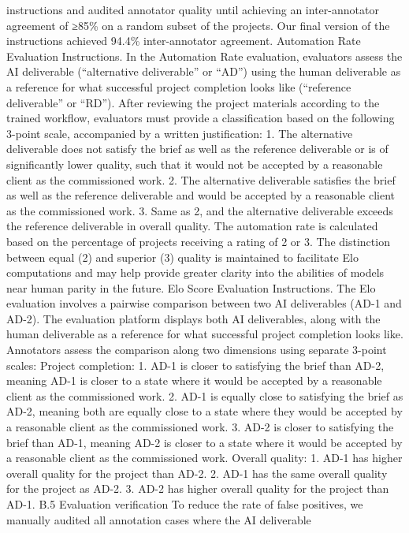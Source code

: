 instructions and audited annotator quality until achieving an inter-annotator agreement of ≥85\% on a
random subset of the projects. Our final version of the instructions achieved 94.4\% inter-annotator
agreement.
Automation Rate Evaluation Instructions.
In the Automation Rate evaluation, evaluators assess
the AI deliverable (“alternative deliverable” or “AD”) using the human deliverable as a reference for
what successful project completion looks like (“reference deliverable” or “RD”). After reviewing the
project materials according to the trained workflow, evaluators must provide a classification based on
the following 3-point scale, accompanied by a written justification:
1. The alternative deliverable does not satisfy the brief as well as the reference deliverable or is
of significantly lower quality, such that it would not be accepted by a reasonable client as
the commissioned work.
2. The alternative deliverable satisfies the brief as well as the reference deliverable and would
be accepted by a reasonable client as the commissioned work.
3. Same as 2, and the alternative deliverable exceeds the reference deliverable in overall quality.
The automation rate is calculated based on the percentage of projects receiving a rating of 2 or 3. The
distinction between equal (2) and superior (3) quality is maintained to facilitate Elo computations
and may help provide greater clarity into the abilities of models near human parity in the future.
Elo Score Evaluation Instructions.
The Elo evaluation involves a pairwise comparison between
two AI deliverables (AD-1 and AD-2). The evaluation platform displays both AI deliverables,
along with the human deliverable as a reference for what successful project completion looks like.
Annotators assess the comparison along two dimensions using separate 3-point scales:
Project completion:
1. AD-1 is closer to satisfying the brief than AD-2, meaning AD-1 is closer to a state where it
would be accepted by a reasonable client as the commissioned work.
2. AD-1 is equally close to satisfying the brief as AD-2, meaning both are equally close to a
state where they would be accepted by a reasonable client as the commissioned work.
3. AD-2 is closer to satisfying the brief than AD-1, meaning AD-2 is closer to a state where it
would be accepted by a reasonable client as the commissioned work.
Overall quality:
1. AD-1 has higher overall quality for the project than AD-2.
2. AD-1 has the same overall quality for the project as AD-2.
3. AD-2 has higher overall quality for the project than AD-1.
B.5
Evaluation verification
To reduce the rate of false positives, we manually audited all annotation cases where the AI deliverable
